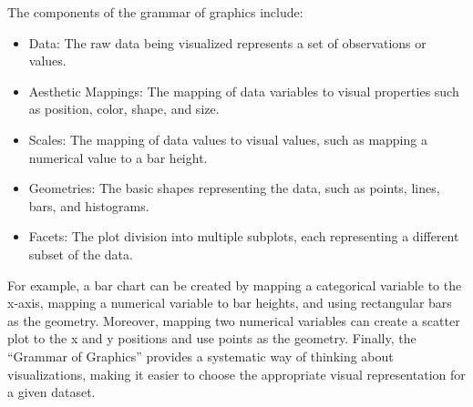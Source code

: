 \documentclass[print]{nuthesis}
\begin{document}
The components of the grammar of graphics include:

\begin{itemize}
\item
  Data: The raw data being visualized represents a set of observations or values.
\item
  Aesthetic Mappings: The mapping of data variables to visual properties such as position, color, shape, and size.
\item
  Scales: The mapping of data values to visual values, such as mapping a numerical value to a bar height.
\item
  Geometries: The basic shapes representing the data, such as points, lines, bars, and histograms.
\item
  Facets: The plot division into multiple subplots, each representing a different subset of the data.
\end{itemize}

For example, a bar chart can be created by mapping a categorical variable to the x-axis, mapping a numerical variable to bar heights, and using rectangular bars as the geometry.
Moreover, mapping two numerical variables can create a scatter plot to the x and y positions and use points as the geometry.
Finally, the ``Grammar of Graphics'' provides a systematic way of thinking about visualizations, making it easier to choose the appropriate visual representation for a given dataset.
\end{document}
